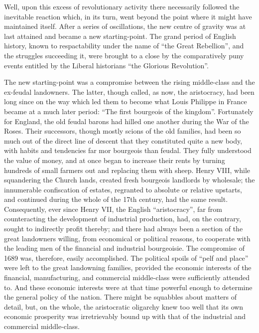 Well, upon this excess of revolutionary activity there necessarily followed the
inevitable reaction which, in its turn, went beyond the point where it might
have maintained itself. After a series of oscillations, the new centre of
gravity was at last attained and became a new starting-point. The grand period
of English history, known to respactability under the name of ``the Great
Rebellion'', and the struggles succeeding it, were brought to a close by the
comparatively puny events entitled by the Liberal historians ``the Glorious
Revolution''.

The new starting-point was a compromise between the rising middle-class and the
ex-feudal landowners. The latter, though called, as now, the aristocracy, had
been long since on the way which led them to become what Louis Philippe in
France became at a much later period: ``The first bourgeois of the kingdom''.
Fortunately for England, the old feudal barons had hilled one another during the
War of the Roses. Their successors, though mostly scions of the old families,
had been so much out of the direct line of descent that they constituted quite a
new body, with habits and tendencies far mor bourgeois than feudal. They fully
understood the value of money, and at once began to increase their rents by
turning hundreds of small farmers out and replacing them with sheep. Henry VIII,
while squandering the Church lands, created fresh bourgeois landlords by
wholesale; the innumerable confiscation of estates, regranted to absolute or
relative upstarts, and continued during the whole of the 17th century, had the
same result. Consequently, ever since Henry VII, the English ``aristocracy'',
far from counteracting the development of industrial production, had, on the
contrary, sought to indirectly profit thereby; and there had always been a
section of the great landowners willing, from economical or political reasons,
to cooperate with the leading men of the financial and industrial bourgeoisie.
The compromise of 1689 was, therefore, easily accomplished. The political spoils
of ``pelf and place'' were left to the great landowning families, provided the
economic interests of the financial, manufacturing, and commercial middle-class
were sufficiently attended to. And these economic interests were at that time
powerful enough to determine the general policy of the nation. There might be
squabbles about matters of detail, but, on the whole, the aristocratic oligarchy
knew too well that its own economic prosperity was irretrievably bound up with
that of the industrial and commercial middle-class.


